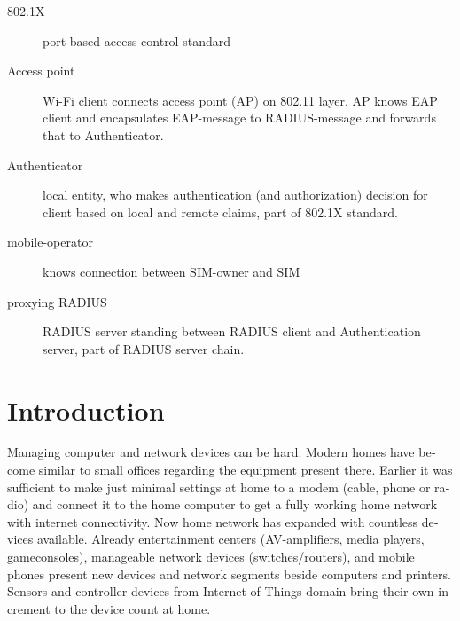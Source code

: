 \documentclass[12pt,a4paper,english]{tutthesis}
\begin{document}
\begin{otherlanguage}{english}

\begin{description}
\item[{802.1X}] port based access control standard
\item[{Access point}] Wi-Fi client connects access point (AP) on 802.11
layer. AP knows EAP client and encapsulates EAP-message
to RADIUS-message and forwards that to
Authenticator.
\end{description}
\begin{description}
\item[{Authenticator}] local entity, who makes authentication (and
authorization) decision for client based on local and remote
claims, part of 802.1X standard.
\end{description}
\begin{description}
\item[{mobile-operator}] knows connection between SIM-owner and SIM
\end{description}
\begin{description}
\item[{proxying RADIUS}] RADIUS server standing between RADIUS
client and Authentication server, part of RADIUS server chain.
\end{description}



\if@twoside
\cleardoublepage
\fi

\newpage             %
\setcounter{page}{1} %
\renewcommand{\chaptername}{} %

\chapter{Introduction}
\label{sec-1}
\label{cha:intro}


Managing computer and network devices can be hard.  Modern homes have
become similar to small offices regarding the equipment present there.
Earlier it was sufficient to make just minimal settings at home to a
modem (cable, phone or radio) and connect it to the home computer to
get a fully working home network with internet connectivity.  Now home
network has expanded with countless devices available.  Already
entertainment centers (AV-amplifiers, media players, gameconsoles),
manageable network devices (switches/routers), and mobile phones
present new devices and network segments beside computers and
printers. Sensors and controller devices from Internet of Things
domain bring their own increment to the device count at home.


\end{otherlanguage}
\end{document}
